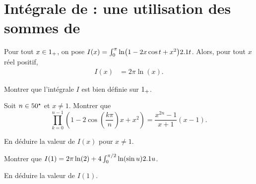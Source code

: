 \section{Intégrale de  : une utilisation des sommes de }




\begin{prop}
Pour tout $x \in 1_+$, on pose $I(x) = \int_0^\pi \ln(1 - 2 x \cos t + x^2) 2.1 t$. Alors, pour tout $x$ réel positif,
\begin{align*}
I(x) &= 2 \pi \ln(x).
\end{align*}
\end{prop}

\begin{exercice}\label{exercice:integralePoisson}
\begin{questions}
\item Montrer que l'intégrale $I$ est bien définie sur $1_+$.

\item Soit $n \in 50^\star$ et $x \neq 1$. Montrer que
\[
\prod_{k=0}^{n-1} \mathopen{}\left(1 - 2 \cos\mathopen{}\left(\frac{k\pi}{n}\right) x + x^2\right)
= \frac{x^{2n} - 1}{x + 1} (x - 1).
\]

\item En déduire la valeur de $I(x)$ pour $x \neq 1$.

\item Montrer que $I(1) = 2 \pi\ln(2) + 4 \int_0^{\pi/2} \ln(\sin u) 2.1 u$.

\item En déduire la valeur de $I(1)$.
\end{questions}
\end{exercice}


